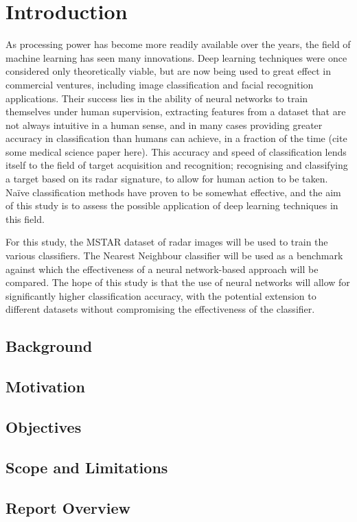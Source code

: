 \chapter{Introduction}

As processing power has become more readily available over the years, the field of machine learning has seen many innovations. Deep learning techniques were once considered only theoretically viable, but are now being used to great effect in commercial ventures, including image classification and facial recognition applications. Their success lies in the ability of neural networks to train themselves under human supervision,  extracting features from a dataset that are not always intuitive in a human sense, and in many cases providing greater accuracy in classification than humans can achieve, in a fraction of the time (cite some medical science paper here). This accuracy and speed of classification lends itself to the field of target acquisition and recognition; recognising and classifying a target based on its radar signature, to allow for human action to be taken. Na{\"i}ve classification methods have proven to be somewhat effective, and the aim of this study is to assess the possible application of deep learning techniques in this field.

For this study, the MSTAR dataset of radar images will be used to train the various classifiers. The Nearest Neighbour classifier will be used as a benchmark against which the effectiveness of a neural network-based approach will be compared. The hope of this study is that the use of neural networks will allow for significantly higher classification accuracy, with the potential extension to different datasets without compromising the effectiveness of the classifier.


\section{Background}

\section{Motivation}

\section{Objectives}

\section{Scope and Limitations}

\section{Report Overview}


